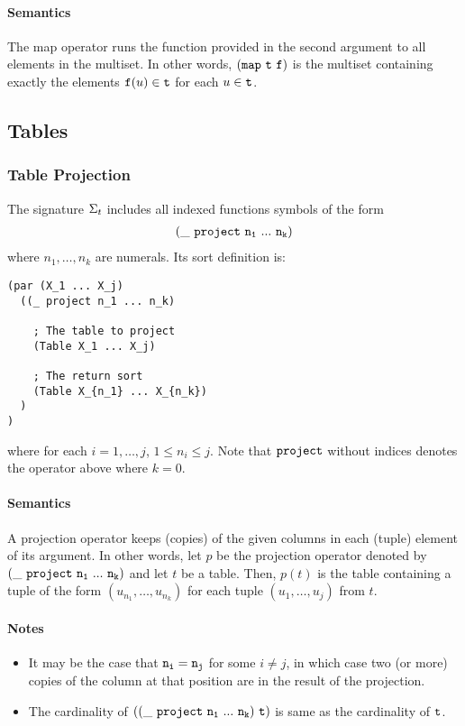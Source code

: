 \documentclass[english,a4paper,10pt]{article}
\begin{document}
\paragraph{Semantics}
The map operator runs the function provided
in the second argument to all elements in the multiset.
In other words,
${\tt (map\ t\ f)}$
is the multiset containing exactly
the elements ${\tt f}(u) \in {\tt t}$
for each $u \in {\tt t}$.


\subsection{Tables}

\subsubsection{Table Projection}
The signature $\Sigma_{t}$ includes 
all indexed functions symbols of the form
\begin{align*}
{\tt  
(\_\ project\ n_1\ ...\ n_k)
}
\end{align*}
where $n_1, \ldots, n_k$ are numerals.
Its sort definition is:
\begin{verbatim}
(par (X_1 ... X_j) 
  ((_ project n_1 ... n_k)
  
    ; The table to project
    (Table X_1 ... X_j)
    
    ; The return sort
    (Table X_{n_1} ... X_{n_k})
  )
)
\end{verbatim}
where for each $i = 1, \ldots, j$,
$1 \leq n_i \leq j$. 
Note that
${\tt project}$ without indices
denotes the operator above where $k=0$.

\paragraph{Semantics}

A projection operator keeps (copies) of the given columns
in each (tuple) element of its argument.
In other words,
let $p$ be the projection operator denoted by ${\tt (\_\ project\ n_1\ ...\ n_k)}$
and let $t$ be a table.
Then, $p(t)$
is the table containing a tuple of the form
$(u_{n_1}, \ldots, u_{n_k})$
for each tuple $(u_1, \ldots, u_j)$ from $t$.

\paragraph{Notes}
\begin{itemize}
\item
It may be the case that ${\tt n_i} = {\tt n_j}$ for some $i \neq j$,
in which case two (or more) copies of the column at that position
are in the result of the projection.
\item
The cardinality of $\syntax{((\_\ project\ n_1\ ...\ n_k)\ t)}$ is
same as the cardinality of ${\tt t}$.
\end{itemize}
\end{document}
